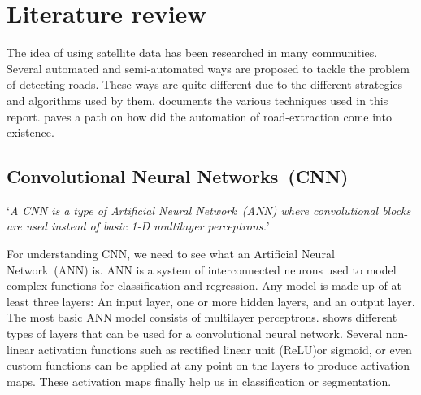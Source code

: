 \chapter{Literature review}\label{chapt:lit}
The idea of using satellite data has been researched in many communities. Several automated and semi-automated ways are proposed to tackle the problem of detecting roads. These ways are quite different due to the different strategies and algorithms used by them.  documents the various techniques used in this report.  paves a path on how did the automation of road-extraction come into existence.

\section{Convolutional Neural Networks~(CNN)}\label{sec:cnn}
`\textit{A CNN is a type of Artificial Neural Network~(ANN) where convolutional blocks are used instead of basic 1-D multilayer perceptrons.}'

For understanding CNN, we need to see what an Artificial Neural Network~(ANN) is. ANN is a system of interconnected neurons used to model complex functions for classification and regression. Any model is made up of at least three layers: An input layer, one or more hidden layers, and an output layer. The most basic ANN model consists of multilayer perceptrons.  shows different types of layers that can be used for a convolutional neural network. Several non-linear activation functions such as rectified linear unit (ReLU)or sigmoid, or even custom functions can be applied at any point on the layers to produce activation maps. These activation maps finally help us in classification or segmentation.

